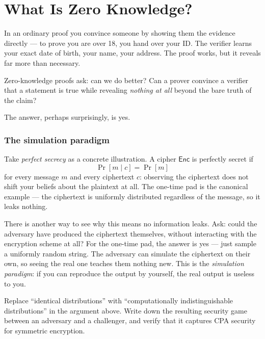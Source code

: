 \section{What Is Zero Knowledge?}
\label{sec:zero-knowledge}

In an ordinary proof you convince someone by showing them the evidence directly --- to prove you are over 18, you hand over your ID. The verifier learns your exact date of birth, your name, your address. The proof works, but it reveals far more than necessary.

Zero-knowledge proofs ask: can we do better? Can a prover convince a verifier that a statement is true while revealing \emph{nothing at all} beyond the bare truth of the claim?

The answer, perhaps surprisingly, is yes.

\subsubsection*{The simulation paradigm}

Take \emph{perfect secrecy} as a concrete illustration. A cipher $\mathsf{Enc}$ is perfectly secret if
\[
  \Pr[m \mid c] = \Pr[m]
\]
for every message $m$ and every ciphertext $c$: observing the ciphertext does not shift your beliefs about the plaintext at all. The one-time pad is the canonical example --- the ciphertext is uniformly distributed regardless of the message, so it leaks nothing.

There is another way to see why this means no information leaks. Ask: could the adversary have produced the ciphertext themselves, without interacting with the encryption scheme at all? For the one-time pad, the answer is yes --- just sample a uniformly random string. The adversary can simulate the ciphertext on their own, so seeing the real one teaches them nothing new. This is the \emph{simulation paradigm}: if you can reproduce the output by yourself, the real output is useless to you.

\begin{exercisebox}
  Replace ``identical distributions'' with ``computationally indistinguishable distributions'' in the argument above. Write down the resulting security game between an adversary and a challenger, and verify that it captures CPA security for symmetric encryption.
\end{exercisebox}

